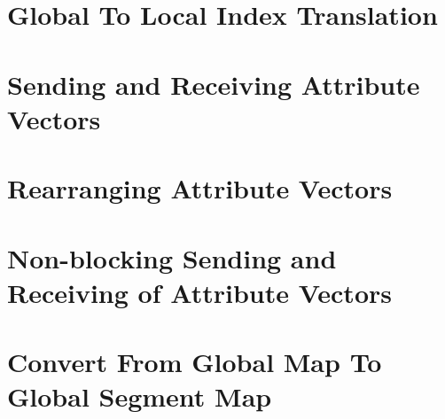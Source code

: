 \documentclass{article}
\begin{document}
\section{Global To Local Index Translation}

\vspace*{\fill}
\newpage
%
\section{Sending and Receiving Attribute Vectors}

\vspace*{\fill}
\newpage

\vspace*{\fill}
\newpage



%
\section{Rearranging Attribute Vectors}

\vspace*{\fill}
\newpage
%
\section{Non-blocking Sending and Receiving of Attribute Vectors}

\vspace*{\fill}
\newpage
%
\section{Convert From Global Map To Global Segment Map}

\vspace*{\fill}
\newpage


 
%
\end{document}
